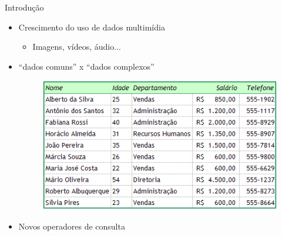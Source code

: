 \documentclass{beamer}
\begin{document}
\begin{frame}{Introdução}
  \begin{itemize}
    \item Crescimento do uso de dados multimídia
      \begin{itemize}
	\item Imagens, vídeos, áudio...\newline
      \end{itemize}
    \item ``dados comuns'' x ``dados complexos''\newline
	\begin{figure}[H]
			\centering
			\includegraphics[width=.5\textwidth]{dado_comum.png}
			\label{fig:dado_comum}
	\end{figure}
    \item Novos operadores de consulta\newline
  \end{itemize}


\end{frame}
\end{document}
